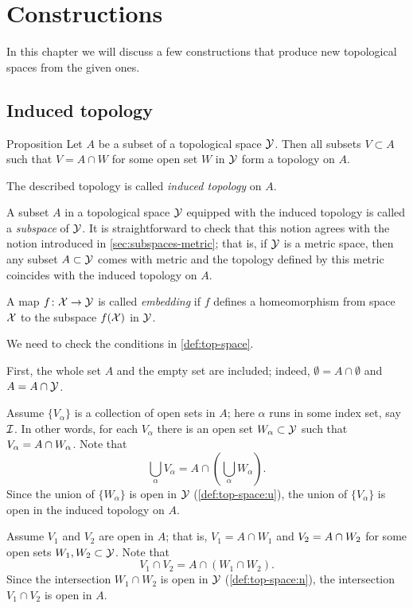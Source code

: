 \chapter{Constructions}

In this chapter we will discuss a few constructions that produce new topological spaces from the given ones.

\section{Induced topology}\label{sec:induced-topology}


\begin{thm}{Proposition}
Let $A$ be a subset of a topological space $\mathcal{Y}$.
Then all subsets $V\subset A$ such that $V=A\cap W$ for some open set $W$ in $\mathcal{Y}$ form a topology on $A$.
\end{thm}

The described topology is called \emph{induced topology} on $A$.

A subset $A$ in a topological space $\mathcal{Y}$ equipped with the induced topology is called a \emph{subspace} of $\mathcal{Y}$.
It is straightforward to check that this notion agrees with the notion introduced in \ref{sec:subspaces-metric};
that is, if $\mathcal{Y}$ is a metric space, then any subset $A\subset\mathcal{Y}$ comes with metric
and the topology defined by this metric coincides with the induced topology on $A$.

A map $f\colon\mathcal{X}\to \mathcal{Y}$ is called \emph{embedding} if $f$ defines a homeomorphism from space $\mathcal{X}$ to the subspace $f(\mathcal{X})$ in $\mathcal{Y}$.

We need to check the conditions in \ref{def:top-space}.

First, the whole set $A$ and the empty set are included;
indeed, $\emptyset=A\cap \emptyset$ and $A=A\cap \mathcal{Y}$.

Assume $\{V_\alpha\}$ is a collection of open sets in $A$; here $\alpha$ runs in some index set, say $\mathcal{I}$.
In other words, for each $V_\alpha$ there is an open set $W_\alpha\subset\mathcal{Y}$ such that $V_\alpha\z=A\cap W_\alpha$.
Note that
\[\bigcup_\alpha V_\alpha=A\cap\left(\bigcup_\alpha W_\alpha\right).\]
Since the union of $\{W_\alpha\}$ is open in $\mathcal{Y}$ (\ref{def:top-space:u}), the union of $\{V_\alpha\}$ is open in the induced topology on $A$.

Assume $V_1$ and $V_2$ are open in $A$; 
that is, $V_1=A\cap W_1$ and  $V_2\z=A\cap W_2$ for some open sets $W_1,W_2\subset\mathcal{Y}$.
Note that
\[V_1\cap V_2=A\cap(W_1\cap W_2).\]
Since the intersection $W_1\cap W_2$ is open in $\mathcal{Y}$ (\ref{def:top-space:n}),
the intersection $V_1\cap V_2$ is open in $A$.
\qeds


